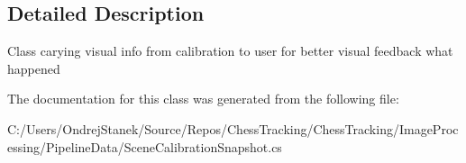 \subsection{Detailed Description}
Class carying visual info from calibration to user for better visual feedback what happened 



The documentation for this class was generated from the following file\+:\begin{DoxyCompactItemize}
\item 
C\+:/\+Users/\+Ondrej\+Stanek/\+Source/\+Repos/\+Chess\+Tracking/\+Chess\+Tracking/\+Image\+Processing/\+Pipeline\+Data/Scene\+Calibration\+Snapshot.\+cs\end{DoxyCompactItemize}
